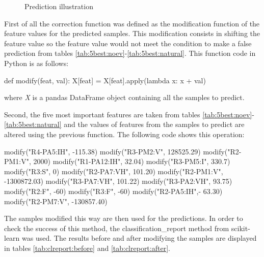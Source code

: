 \begin{figure}[H]
    \centering
    \caption{Prediction illustration} \label{fig:predict}
\end{figure}

First of all the correction function was defined as the modification function of the feature values for the predicted samples. This modification consists in shifting the feature value so the feature value would not meet the condition to make a false prediction from tables \ref{tab:5best:noev}-\ref{tab:5best:natural}. This function code in Python is as follows:  
\begin{python}
def modify(feat, val):
    X[feat] = X[feat].apply(lambda x: x + val)
\end{python}
where \textit{X} is a pandas DataFrame object containing all the samples to predict.

Second, the five most important features are taken from tables \ref{tab:5best:noev}-\ref{tab:5best:natural} and the values of features from the samples to predict are altered using the previous function. The following code shows this operation:
\begin{python}
modify("R4-PA5:IH", -115.38)
modify("R3-PM2:V", 128525.29)
modify("R2-PM1:V", 2000)
modify("R1-PA12:IH", 32.04)
modify("R3-PM5:I", 330.7)
modify("R3:S", 0)
modify("R2-PA7:VH", 101.20)
modify("R2-PM1:V", -1300872.03)
modify("R3-PA7:VH", 101.22)
modify("R3-PA2:VH", 93.75)    
modify("R2:F", -60)
modify("R3:F", -60)
modify("R2-PA5:IH",- 63.30)
modify("R2-PM7:V", -130857.40) 
\end{python}

The samples modified this way are then used for the predictions. In order to check the success of this method, the classification\_report method from scikit-learn was used. The results before and after modifying the samples are displayed in tables \ref{tab:clreport:before} and \ref{tab:clreport:after}.

